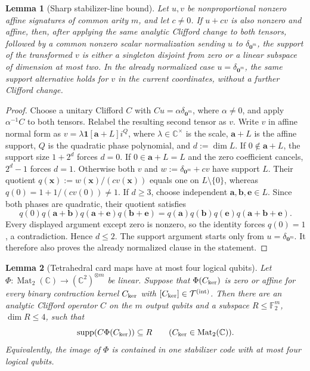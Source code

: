 \documentclass[11pt,letterpaper,onecolumn]{article}
\theoremstyle{plain}
\newtheorem{lemma}[lemma]{Lemma}
\theoremstyle{definition}
\theoremstyle{remark}
\newcommand{\Ftwo}{\mathbb F_2}
\newcommand{\TetInt}{{\mathcal T^{(\mathrm{int})}}}
\newcommand{\Mat}{\operatorname{Mat}}
\newcommand{\supp}{\operatorname{supp}}
\newcommand{\one}{\mathbf 1}
\newcommand{\zero}{\mathbf 0}
\begin{document}
\begin{lemma}[Sharp stabilizer-line bound]
\label{lem:a4rel-sharp-stabilizer-line}
Let \(u,v\) be nonproportional nonzero affine signatures of common
arity \(m\), and let \(c\ne0\).  If \(u+cv\) is also nonzero and affine, then, after applying the same analytic Clifford change to both
tensors, followed by a common nonzero scalar normalization sending
\(u\) to \(\delta_{\zero^m}\), the support of the transformed
\(v\) is either a singleton disjoint from zero or a linear subspace of
dimension at most two.  In the already normalized case
\(u=\delta_{\zero^m}\), the same support alternative holds for \(v\)
in the current coordinates, without a further Clifford change.
\end{lemma}

\begin{proof}
Choose a unitary Clifford \(C\) with \(Cu=\alpha\delta_{\zero^m}\),
where \(\alpha\ne0\), and apply \(\alpha^{-1}C\) to both tensors.
Relabel the resulting second tensor as \(v\).
Write \(v\) in affine normal form as
\(v=\lambda\one[{\mathbf{a}}+L]i^Q\), where \(\lambda\in\mathbb C^\times\) is the scale,
\({\mathbf{a}}+L\) is the affine support, \(Q\) is the quadratic phase polynomial, and
\(d:=\dim L\).  If
\(0\notin {\mathbf{a}}+L\), the support size \(1+2^d\) forces \(d=0\).  If
\(0\in {\mathbf{a}}+L=L\) and the zero coefficient cancels, \(2^d-1\) forces \(d=1\).
Otherwise both \(v\) and \(w:=\delta_{\zero^m}+cv\) have support \(L\).
Their quotient \(q({\mathbf{x}}):=w({\mathbf{x}})/(cv({\mathbf{x}}))\) equals one on \(L\setminus\{0\}\),
whereas \(q(0)=1+1/(cv(0))\ne1\).  If \(d\ge3\), choose independent
\({\mathbf{a}},{\mathbf{b}},{\mathbf{e}}\in L\).  Since both phases are quadratic, their quotient satisfies
\[
 q(0)q({\mathbf{a}}+{\mathbf{b}})q({\mathbf{a}}+{\mathbf{e}})q({\mathbf{b}}+{\mathbf{e}})
 =q({\mathbf{a}})q({\mathbf{b}})q({\mathbf{e}})q({\mathbf{a}}+{\mathbf{b}}+{\mathbf{e}}).
\]
Every displayed argument except zero is nonzero, so the identity forces
\(q(0)=1\), a contradiction.  Hence \(d\le2\).
The support argument starts only from \(u=\delta_{\zero^m}\). It therefore
also proves the already normalized clause in the statement.
\end{proof}

\begin{lemma}[Tetrahedral card maps have at most four logical qubits]
\label{lem:a4rel-four-active-qubits}
Let
\(
 \Phi:\Mat_2(\mathbb C)\to(\mathbb C^2)^{\otimes m}
\)
be linear.  Suppose that \(\Phi(C_{\rm ker})\) is zero or affine for every binary contraction
kernel \(C_{\rm ker}\) with \([C_{\rm ker}]\in\TetInt\).
Then there are an analytic Clifford operator \(C\) on the \(m\) output
qubits and a subspace \(R\le\Ftwo^m\), \(\dim R\le4\), such that
\begin{equation}
 \supp(C\Phi(C_{\rm ker}))\subseteq R
 \qquad(C_{\rm ker}\in\Mat_2(\mathbb C)).
 \label{eq:a4rel-common-active-support}
\end{equation}
Equivalently, the image of \(\Phi\) is contained in one stabilizer code
with at most four logical qubits.
\end{lemma}
\end{document}
